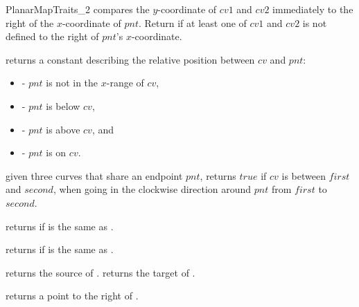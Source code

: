 \begin{ccRefConcept}{PlanarMapTraits_2}
   {compares the $y$-coordinate of $cv1$ and
     $cv2$ immediately to the right of the $x$-coordinate of $pnt$.
     Return  if at least one of $cv1$ and $cv2$ is
     not defined to the right of $pnt$'s $x$-coordinate.}

    
     {returns a constant describing the
       relative position between $cv$ and $pnt$:
       \begin{itemize}
       \item[] - $pnt$ is not in the $x$-range of
       $cv$, 
       \item[] - $pnt$ is below $cv$,
       \item[] - $pnt$ is above $cv$, and
       \item[] - $pnt$ is on $cv$.
       \end{itemize}}
       
        {given three curves that share an endpoint $pnt$,
          returns $true$ if $cv$ is between $first$ and $second$, when
          going in the clockwise direction around $pnt$ from $first$
          to $second$. }


       {returns  if  is the same as .}

       {returns  if  is the same as .}
	  

             {returns the source of .}
             {returns the target of .}

         {returns a point to the right of .} %


\end{ccRefConcept}
